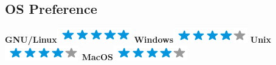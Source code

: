 \documentclass[]{friggeri-cv}
\begin{document}
\begin{aside}
  \section{OS Preference}
    \textbf{GNU/Linux}\includegraphics[scale=0.40]{img/5stars.png}
    \textbf{Windows}\includegraphics[scale=0.40]{img/4stars.png}
    \textbf{Unix}\includegraphics[scale=0.40]{img/4stars.png}
    \textbf{MacOS}\includegraphics[scale=0.40]{img/4stars.png}
    ~
\end{aside}
\end{document}
